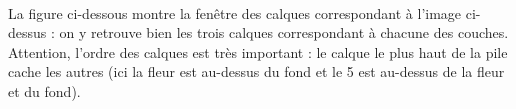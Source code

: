 \begin{minipage}[c]{.22\textwidth}
\centering%
\end{minipage}\\[12pt]
\begin{minipage}[c]{.22\textwidth}
\end{minipage}\hfill%
\begin{minipage}[c]{.22\textwidth}
\end{minipage}\hfill%
\begin{minipage}[c]{.22\textwidth}
\end{minipage}\hfill%
\begin{minipage}[c]{.22\textwidth}
\end{minipage}


\vspace{16pt}

La figure ci-dessous montre la fenêtre des calques correspondant à l'image ci-dessus : on y retrouve bien les trois calques correspondant à chacune des couches. Attention, l'ordre des calques est très important : le calque le plus haut de la pile cache les autres (ici la fleur est au-dessus du fond et le 5 est au-dessus de la fleur et du fond).

